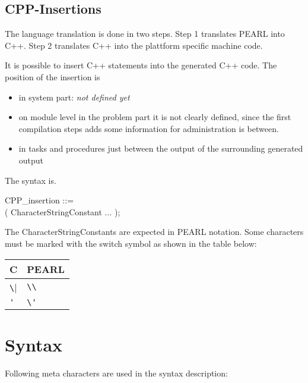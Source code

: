 \begin{added}
\section{CPP-Insertions}
The language translation is done in two steps.
Step 1 translates PEARL into C++.
Step 2 translates C++ into the plattform specific machine code.

It is possible to insert C++ statements into the generated C++ 
code. The position of the insertion is
\begin{itemize}
\item in system part: {\em not defined yet}
\item on module level in the problem part 
   it is not clearly defined, since the first compilation
   steps adds some information for administration is between.
\item in tasks and procedures just between the output of the surrounding
generated output
\end{itemize}

The syntax is.

CPP\_insertion ::=\\
 ( CharacterStringConstant ... );

The CharacterStringConstants are expected in PEARL notation.
Some characters must be marked with the switch symbol as shown in the table
below:

\begin{tabular}{l|l}
C & PEARL \\
\hline
\verb|\| & \verb|\\| \\
\verb|'| & \verb|\'|  \\
\end{tabular}
\end{added}

\newpage
\section{Syntax}    %

Following meta characters are used in the syntax description:\\ 

